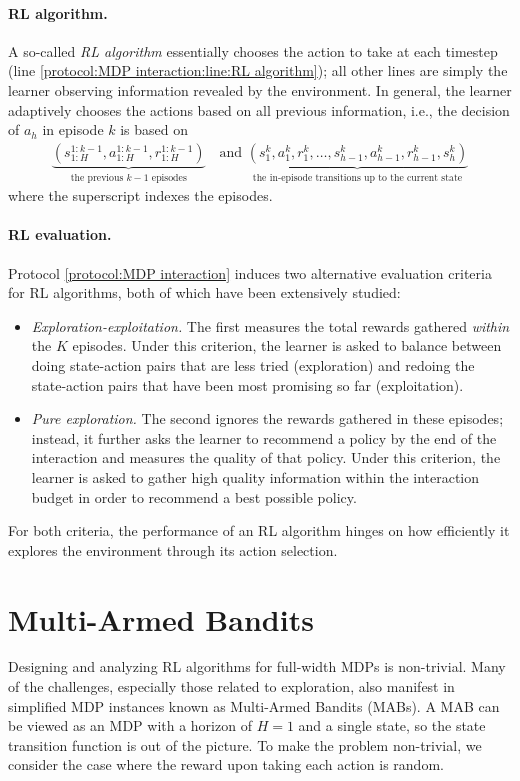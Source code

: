 \paragraph{RL algorithm.}
A so-called {\em RL algorithm} essentially chooses the action to take at each timestep (line \ref{protocol:MDP interaction:line:RL algorithm});
all other lines are simply the learner observing information revealed by the environment.
In general, the learner adaptively chooses the actions based on all previous information, i.e., the decision of $a_h$ in episode $k$ is based on
\begin{align*}
    \underbrace{(s^{1:k-1}_{1:H},a^{1:k-1}_{1:H},r^{1:k-1}_{1:H})}_{\text{the previous $k-1$ episodes}}
    \quad \text{and } \underbrace{(s^k_1,a^k_1,r^k_1,\ldots,s^k_{h-1},a^k_{h-1},r^k_{h-1}, s^k_h)}_{\text{the in-episode transitions up to the current state}}
\end{align*}
where the superscript indexes the episodes.

\paragraph{RL evaluation.}
Protocol \ref{protocol:MDP interaction} induces two alternative evaluation criteria for RL algorithms, both of which have been extensively studied:
\begin{itemize}
    \item {\em Exploration-exploitation.}
    The first measures the total rewards gathered {\em within} the $K$ episodes.
    Under this criterion, the learner is asked to balance between doing state-action pairs that are less tried (exploration) and redoing the state-action pairs that have been most promising so far (exploitation).

    \item {\em Pure exploration.}
    The second ignores the rewards gathered in these episodes; instead, it further asks the learner to recommend a policy by the end of the interaction and measures the quality of that policy.
    Under this criterion, the learner is asked to gather high quality information within the interaction budget in order to recommend a best possible policy. 
\end{itemize}
For both criteria, the performance of an RL algorithm hinges on how efficiently it explores the environment through its action selection.

\section{Multi-Armed Bandits}
Designing and analyzing RL algorithms for full-width MDPs is non-trivial.
Many of the challenges, especially those related to exploration, also manifest in simplified MDP instances known as Multi-Armed Bandits (MABs).
A MAB can be viewed as an MDP with a horizon of $H=1$ and a single state, so the state transition function is out of the picture.
To make the problem non-trivial, we consider the case where the reward upon taking each action is random.

